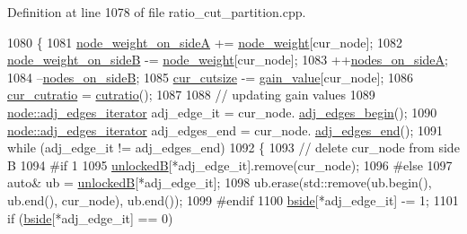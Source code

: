 Definition at line 1078 of file ratio\+\_\+cut\+\_\+partition.\+cpp.


\begin{DoxyCode}
1080 \{
1081     \mbox{\hyperlink{classratio__cut__partition_af1b839e48e498cf8ca93c8ec5df8a686}{node\_weight\_on\_sideA}} += \mbox{\hyperlink{classratio__cut__partition_a4d9d2a9317a062f839ea7155c37b173f}{node\_weight}}[cur\_node];
1082     \mbox{\hyperlink{classratio__cut__partition_aa16d1b508db86eb0ba4824642394999a}{node\_weight\_on\_sideB}} -= \mbox{\hyperlink{classratio__cut__partition_a4d9d2a9317a062f839ea7155c37b173f}{node\_weight}}[cur\_node];
1083     ++\mbox{\hyperlink{classratio__cut__partition_a7de51193b63e241afe263345479580ee}{nodes\_on\_sideA}};
1084     --\mbox{\hyperlink{classratio__cut__partition_a6b797912a7653537473e0e583a3f245a}{nodes\_on\_sideB}};
1085     \mbox{\hyperlink{classratio__cut__partition_aa01f2d6257fff28739e2431fe826ef71}{cur\_cutsize}} -= \mbox{\hyperlink{classratio__cut__partition_af24ff191abbb0578f0bfc54fef5f6d45}{gain\_value}}[cur\_node];
1086     \mbox{\hyperlink{classratio__cut__partition_a9dad324884cef5bcdd50122fc98e0860}{cur\_cutratio}} = \mbox{\hyperlink{classratio__cut__partition_a0adcba3c7847fcb62b607eebc334c503}{cutratio}}();
1087     
1088     \textcolor{comment}{// updating gain values}
1089     \mbox{\hyperlink{classnode_a12cb1a2167f5f03c054de5e707d3156f}{node::adj\_edges\_iterator}} adj\_edge\_it = cur\_node.
      \mbox{\hyperlink{classnode_a788d3e932a5c164caa5ec82aa47551b2}{adj\_edges\_begin}}();
1090     \mbox{\hyperlink{classnode_a12cb1a2167f5f03c054de5e707d3156f}{node::adj\_edges\_iterator}} adj\_edges\_end = cur\_node.
      \mbox{\hyperlink{classnode_aa1e7887d29390297580769454f769ad6}{adj\_edges\_end}}();
1091     \textcolor{keywordflow}{while} (adj\_edge\_it != adj\_edges\_end)
1092     \{
1093     \textcolor{comment}{// delete cur\_node from side B}
1094 \textcolor{preprocessor}{#if 1}
1095         \mbox{\hyperlink{classratio__cut__partition_af7c877d8c6e9b533ab34cde1c6690b25}{unlockedB}}[*adj\_edge\_it].remove(cur\_node);
1096 \textcolor{preprocessor}{#else}
1097         \textcolor{keyword}{auto}& ub = \mbox{\hyperlink{classratio__cut__partition_af7c877d8c6e9b533ab34cde1c6690b25}{unlockedB}}[*adj\_edge\_it];
1098         ub.erase(std::remove(ub.begin(), ub.end(), cur\_node), ub.end());
1099 \textcolor{preprocessor}{#endif}
1100     \mbox{\hyperlink{classratio__cut__partition_ab9c1166efb1cbb65ff6c55bb6e3c9e6d}{bside}}[*adj\_edge\_it] -= 1;
1101     \textcolor{keywordflow}{if} (\mbox{\hyperlink{classratio__cut__partition_ab9c1166efb1cbb65ff6c55bb6e3c9e6d}{bside}}[*adj\_edge\_it] == 0)

\end{DoxyCode}
